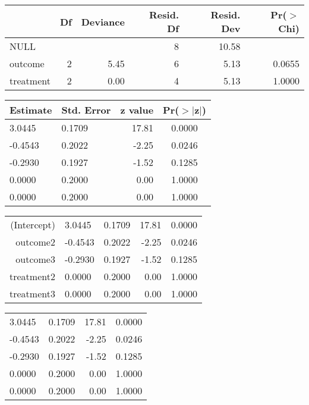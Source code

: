\documentclass[10pt, fullpage, a4paper, titlepage]{article}
\begin{document}
\begin{table}[ht]
\centering
\begin{tabular}{lrrrrr}
  \hline
 & Df & Deviance & Resid. Df & Resid. Dev & Pr($>$Chi) \\ 
  \hline
NULL &  &  & 8 & 10.58 &  \\ 
  outcome & 2 & 5.45 & 6 & 5.13 & 0.0655 \\ 
  treatment & 2 & 0.00 & 4 & 5.13 & 1.0000 \\ 
   \hline
\end{tabular}
\end{table}
\begin{table}[ht]
\centering
\begin{tabular}{|llrc}
  \hline
Estimate & Std. Error & z value & Pr($>$$|$z$|$) \\ 
  \hline
3.0445 & 0.1709 & 17.81 & 0.0000 \\ 
  -0.4543 & 0.2022 & -2.25 & 0.0246 \\ 
  -0.2930 & 0.1927 & -1.52 & 0.1285 \\ 
  0.0000 & 0.2000 & 0.00 & 1.0000 \\ 
  0.0000 & 0.2000 & 0.00 & 1.0000 \\ 
   \hline
\end{tabular}
\end{table}
\begin{table}[ht]
\centering
\begin{tabular}{r||llrc}
  \hline
  \hline
(Intercept) & 3.0445 & 0.1709 & 17.81 & 0.0000 \\ 
  outcome2 & -0.4543 & 0.2022 & -2.25 & 0.0246 \\ 
  outcome3 & -0.2930 & 0.1927 & -1.52 & 0.1285 \\ 
  treatment2 & 0.0000 & 0.2000 & 0.00 & 1.0000 \\ 
  treatment3 & 0.0000 & 0.2000 & 0.00 & 1.0000 \\ 
   \hline
\end{tabular}
\end{table}
\begin{table}[ht]
\centering
\begin{tabular}{||llrc}
  \hline
  \hline
3.0445 & 0.1709 & 17.81 & 0.0000 \\ 
  -0.4543 & 0.2022 & -2.25 & 0.0246 \\ 
  -0.2930 & 0.1927 & -1.52 & 0.1285 \\ 
  0.0000 & 0.2000 & 0.00 & 1.0000 \\ 
  0.0000 & 0.2000 & 0.00 & 1.0000 \\ 
   \hline
\end{tabular}
\end{table}
\end{document}
